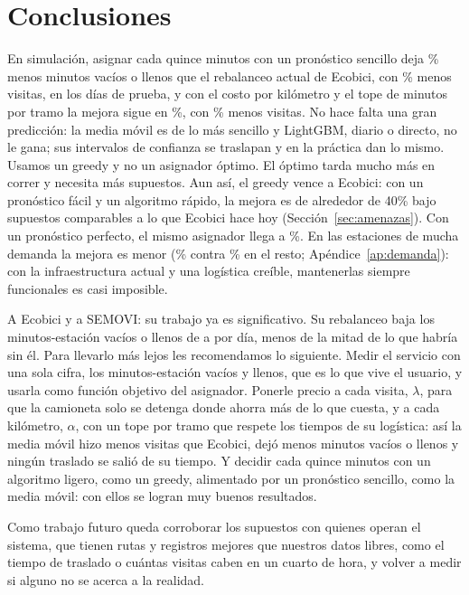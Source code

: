 \documentclass[conference,letterpaper,10pt]{IEEEtran}
\begin{document}
\section{Conclusiones}
En simulación, asignar cada quince minutos con un pronóstico sencillo deja \rmaPct\% menos minutos vacíos o llenos que el rebalanceo actual de Ecobici, con \rmaVisPct\% menos visitas, en los \rdias{} días de prueba, y con el costo por kilómetro y el tope de \tfLimMin{} minutos por tramo la mejora sigue en \caDiezEco\%, con \caDiezVisEco\% menos visitas. No hace falta una gran predicción: la media móvil es de lo más sencillo y LightGBM, diario o directo, no le gana; sus intervalos de confianza se traslapan y en la práctica dan lo mismo. Usamos un greedy y no un asignador óptimo. El óptimo tarda mucho más en correr y necesita más supuestos. Aun así, el greedy vence a Ecobici: con un pronóstico fácil y un algoritmo rápido, la mejora es de alrededor de 40\% bajo supuestos comparables a lo que Ecobici hace hoy (Sección~\ref{sec:amenazas}). Con un pronóstico perfecto, el mismo asignador llega a \rorDPct\%. En las estaciones de mucha demanda la mejora es menor (\rdEFTopRed\% contra \rdEFRestoRed\% en el resto; Apéndice~\ref{ap:demanda}): con la infraestructura actual y una logística creíble, mantenerlas siempre funcionales es casi imposible.

A Ecobici y a SEMOVI: su trabajo ya es significativo. Su rebalanceo baja los minutos-estación vacíos o llenos de \rbaseEF{} a \recoEF{} por día, menos de la mitad de lo que habría sin él. Para llevarlo más lejos les recomendamos lo siguiente. Medir el servicio con una sola cifra, los minutos-estación vacíos y llenos, que es lo que vive el usuario, y usarla como función objetivo del asignador. Ponerle precio a cada visita, $\lambda$, para que la camioneta solo se detenga donde ahorra más de lo que cuesta, y a cada kilómetro, $\alpha$, con un tope por tramo que respete los tiempos de su logística: así la media móvil hizo menos visitas que Ecobici, dejó menos minutos vacíos o llenos y ningún traslado se salió de su tiempo. Y decidir cada quince minutos con un algoritmo ligero, como un greedy, alimentado por un pronóstico sencillo, como la media móvil: con ellos se logran muy buenos resultados.

Como trabajo futuro queda corroborar los supuestos con quienes operan el sistema, que tienen rutas y registros mejores que nuestros datos libres, como el tiempo de traslado o cuántas visitas caben en un cuarto de hora, y volver a medir si alguno no se acerca a la realidad.
\end{document}
